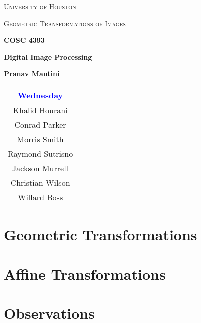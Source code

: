 \documentclass[a4paper]{article}
\begin{document}
\begin{titlepage}
	\centering
	{\scshape\LARGE University of Houston\par}
	\vspace{1cm}
	{\scshape\Large Geometric Transformations of Images \par}
	\vspace{1.5cm}
	{\huge\bfseries COSC 4393 \par}
	{\huge\bfseries Digital Image Processing\par}
	\vspace{0.5cm}
	{\large\bfseries Pranav Mantini\par}
	\vspace{1cm}
	{\Large\itshape \begin{tabular}{|c|}\hline 
	                   \textcolor{blue}{\textbf{Wednesday}} \\\hline 
	                   Khalid Hourani\\\hline
	                   Conrad Parker\\\hline
	                   Morris Smith\\\hline
	                   Raymond Sutrisno\\\hline
	                   Jackson Murrell\\\hline
	                   Christian Wilson\\\hline
	                   Willard Boss\\\hline
	               \end{tabular}\par}
	\vspace{0.5cm}
	{\large \par} %
	\vfill
\end{titlepage}

\tableofcontents
\newpage{}



\section{Geometric Transformations}




\section{Affine Transformations}





\section{Observations}


\end{document}

